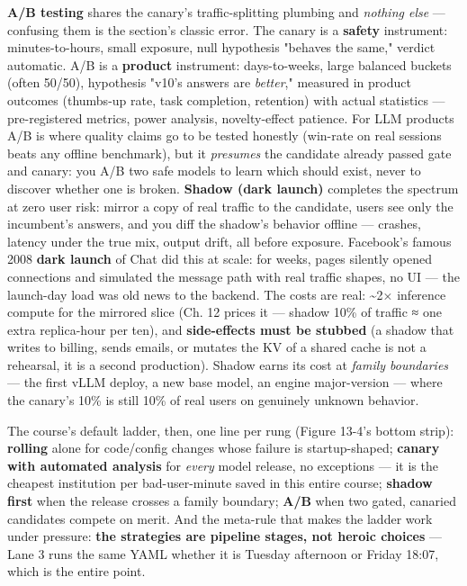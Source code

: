 \textbf{A/B testing} shares the canary's traffic-splitting plumbing and \textit{nothing else} — confusing them is the section's classic error. The canary is a \textbf{safety} instrument: minutes-to-hours, small exposure, null hypothesis "behaves the same," verdict automatic. A/B is a \textbf{product} instrument: days-to-weeks, large balanced buckets (often 50/50), hypothesis "v10's answers are \textit{better}," measured in product outcomes (thumbs-up rate, task completion, retention) with actual statistics — pre-registered metrics, power analysis, novelty-effect patience. For LLM products A/B is where quality claims go to be tested honestly (win-rate on real sessions beats any offline benchmark), but it \textit{presumes} the candidate already passed gate and canary: you A/B two safe models to learn which should exist, never to discover whether one is broken. \textbf{Shadow (dark launch)} completes the spectrum at zero user risk: mirror a copy of real traffic to the candidate, users see only the incumbent's answers, and you diff the shadow's behavior offline — crashes, latency under the true mix, output drift, all before exposure. Facebook's famous 2008 \textbf{dark launch} of Chat did this at scale: for weeks, pages silently opened connections and simulated the message path with real traffic shapes, no UI — the launch-day load was old news to the backend. The costs are real: \textasciitilde{}2× inference compute for the mirrored slice (Ch. 12 prices it — shadow 10\% of traffic ≈ one extra replica-hour per ten), and \textbf{side-effects must be stubbed} (a shadow that writes to billing, sends emails, or mutates the KV of a shared cache is not a rehearsal, it is a second production). Shadow earns its cost at \textit{family boundaries} — the first vLLM deploy, a new base model, an engine major-version — where the canary's 10\% is still 10\% of real users on genuinely unknown behavior.

The course's default ladder, then, one line per rung (Figure 13-4's bottom strip): \textbf{rolling} alone for code/config changes whose failure is startup-shaped; \textbf{canary with automated analysis} for \textit{every} model release, no exceptions — it is the cheapest institution per bad-user-minute saved in this entire course; \textbf{shadow first} when the release crosses a family boundary; \textbf{A/B} when two gated, canaried candidates compete on merit. And the meta-rule that makes the ladder work under pressure: \textbf{the strategies are pipeline stages, not heroic choices} — Lane 3 runs the same YAML whether it is Tuesday afternoon or Friday 18:07, which is the entire point.

